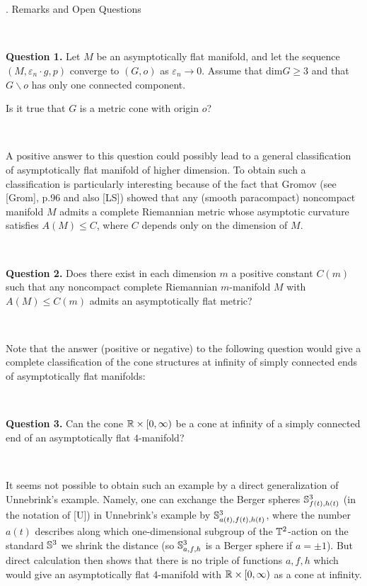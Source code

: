 \

\

. Remarks and Open Questions
\endhead 

\ 

\noindent
{\bf Question 1.\ts} Let $M$ be an asymptotically flat manifold, 
and let the sequence $(M,\varepsilon_n{\cdot}g,p)$ converge to $(G,o)$ 
as $\varepsilon_n\to 0$.
Assume that dim$G\ge 3$ and that $G\backslash o$ 
has only one connected component.

Is it true that $G$ is a metric cone with origin $o$?

\ 

A positive answer to this question could possibly
lead to a general classification 
of asymptotically flat manifold of higher dimension.
To obtain such a classification
is particularly interesting because of the fact
that
Gromov (see [Grom], p.96 and also [LS]) 
showed that any (smooth paracompact) noncompact manifold
$M$ admits a complete Riemannian metric whose asymptotic
curvature satisfies $A(M)\le C$,
where $C$ depends only on the dimension of $M$.

\



\noindent
{\bf Question 2.\ts} 
Does there exist in each dimension $m$
a positive constant $C(m)$ such that any noncompact
complete Riemannian $m$-manifold $M$ with $A(M)\le C(m)$
admits an asymptotically flat metric?

\ 

Note that the answer (positive or negative) 
to the following question would give
a complete classification
of the cone structures at infinity of simply connected ends
of asymptotically flat manifolds:

\ 

\noindent
{\bf Question 3.\ts} Can the cone ${\Bbb R}\times [0,\infty)$ 
be a cone at infinity of a simply connected end of an
asymptotically flat $4$-manifold?

\ 

It seems not possible to obtain such an 
example by a direct generalization of Unnebrink's example. 
Namely, one can exchange 
the Berger spheres 
${\Bbb S}^3_{f(t),h(t)}$ (in the notation of [U]) 
in Unnebrink's example by ${\Bbb S}^3_{a(t),f(t),h(t)}$, 
where the number $a(t)$ describes along which one-dimensional subgroup 
of the ${\Bbb T}^2$-action 
on the standard ${\Bbb S}^3$ we shrink the distance 
(so ${\Bbb S}^3_{a,f,h}$ is a Berger sphere if $a=\pm1$).
But direct calculation then shows that there is no triple of functions
$a,f,h$ which
would give an asymptotically flat 4-manifold with ${\Bbb R}\times [0,\infty)$
as a cone at infinity.

